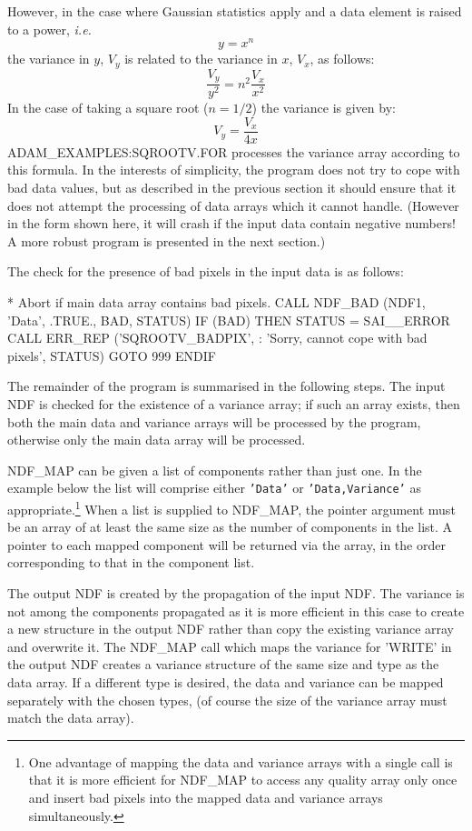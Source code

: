 \documentclass[twoside,11pt,nolof]{starlink}
\begin{document}
However,  in the case where Gaussian statistics apply and
a data element is raised to a power, \textit{i.e.}
$$ y=x^n$$
the variance in $y$, $V_y$ is related to the variance in $x$, $V_x$, as
follows:
$$\frac{V_y}{y^2}=n^2\frac{V_x}{x^2}$$
In the case of taking a square root ($n=1/2$) the variance
is given by:
$$V_y=\frac{V_x}{4x}$$
ADAM\_EXAMPLES:SQROOTV.FOR processes the variance array
according to this formula.
In the interests of simplicity, the program does not try to cope
with bad data values, but as described in
the previous section it should ensure that it does not attempt the
processing of data arrays which it cannot handle.
(However in the form shown here, it will crash if the input data contain
negative numbers! A more robust program is presented in the next section.)

The check for the presence of bad pixels in the input data is as follows:
\begin{terminalv}
*  Abort if main data array contains bad pixels.
      CALL NDF_BAD (NDF1, 'Data', .TRUE., BAD, STATUS)
      IF (BAD) THEN
         STATUS = SAI__ERROR
         CALL ERR_REP ('SQROOTV_BADPIX',
     :                'Sorry, cannot cope with bad pixels', STATUS)
         GOTO 999
      ENDIF
\end{terminalv}
The remainder of the program is summarised in the following steps.
The input NDF is checked for the existence of a variance array;
if such an array exists, then both the main data and variance
arrays will be processed by the program, otherwise only the
main data array  will be processed.

NDF\_MAP can be given a list of components rather than just one.
In the example below the list will comprise either \texttt{'Data'} or
\texttt{'Data,Variance'} as
appropriate.\footnote{One advantage of mapping the data and variance arrays with
a single call is that it is more efficient for NDF\_MAP to access any quality
array only once and insert bad pixels into the mapped data and variance arrays
simultaneously.}
When a list is supplied to NDF\_MAP, the pointer argument must be an array
of at least the same size as the number of components in the list.
A pointer to each mapped component will be returned via the array, in the
order corresponding to that in the component list.

The output NDF is created by the propagation of the input NDF.
The variance is not among the components propagated as it is more efficient
in this case to create a new structure in the output NDF rather
than copy the existing variance array and overwrite it.
The NDF\_MAP call which maps the
variance for 'WRITE' in the output NDF creates a variance structure
of the same size and type as the data array.
If a different type is desired, the data and variance can be mapped
separately with the chosen types, (of course the size of the variance array
must  match the data array).
\end{document}
